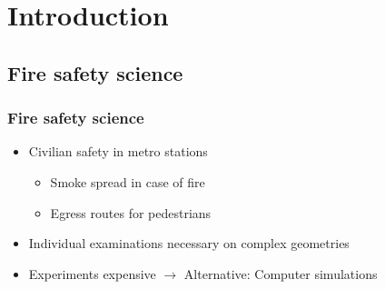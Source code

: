 \section{Introduction}





\subsection{Fire safety science}





\begin{frame}
\frametitle{Fire safety science}

\begin{itemize}
\item Civilian safety in metro stations
  \begin{itemize}
  \item Smoke spread in case of fire
  \item Egress routes for pedestrians
  \end{itemize}
\end{itemize}

\vfill{}

\begin{itemize}
\item Individual examinations necessary on complex geometries
\item Experiments expensive $\longrightarrow$ Alternative: Computer simulations
\end{itemize}


\end{frame}
